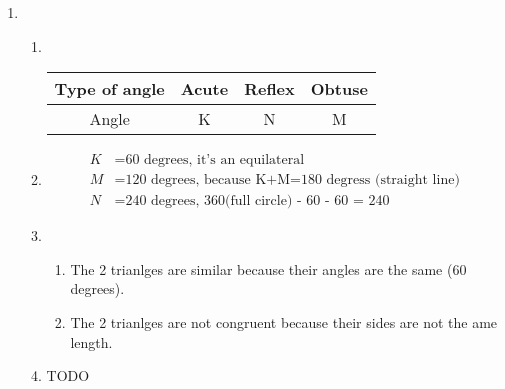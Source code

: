 \documentclass[11pt]{article}
\begin{document}
\begin{enumerate}
    \pagebreak
    \item
        \begin{enumerate}
            \item \ 
            \begin{center}
                \begin{tabular}{|c|c|c|c|} 
                    \hline
                    Type of angle&Acute&Reflex&Obtuse\\
                    \hline
                    Angle&K&N&M\\
                    \hline
                \end{tabular}
            \end{center}
            
            \item
            \begin{equation*}
                \begin{split}
                    K&=\text{60 degrees, it's an equilateral}\\
                    M&=\text{120 degrees, because K+M=180 degress (straight line)}\\
                    N&=\text{240 degrees, 360(full circle) - 60 - 60 = 240}
                \end{split}
            \end{equation*}

            \item
                \begin{enumerate}
                    \item The 2 trianlges are similar because their angles are the same (60 degrees).
                    \item The 2 trianlges are not congruent because their sides are not the ame length.
                \end{enumerate}
            \item TODO
                \begin{equation*}
                    \begin{split}
                    \end{split}
                \end{equation*}
        \end{enumerate}


\end{enumerate}
\end{document}

